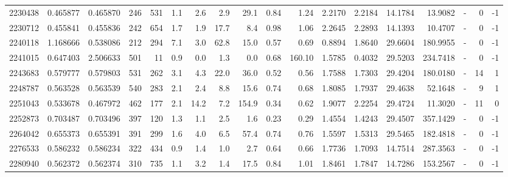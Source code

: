 \begin{tabular}{rrrrrrrrrrrrrrrlrr}
   2230438 & 0.465877 &   0.465870 &  246 &  531 &      1.1 &      2.6 &     2.9 &     29.1 &       0.84 &        1.24 &  2.2170 &  2.2184 &   14.1784 &   13.9082 &             - &        0 &         -1 \\
   2230712 & 0.455841 &   0.455836 &  242 &  654 &      1.7 &      1.9 &    17.7 &      8.4 &       0.98 &        1.06 &  2.2645 &  2.2893 &   14.1393 &   10.4707 &             - &        0 &         -1 \\
   2240118 & 1.168666 &   0.538086 &  212 &  294 &      7.1 &      3.0 &    62.8 &     15.0 &       0.57 &        0.69 &  0.8894 &  1.8640 &   29.6604 &  180.9955 &             - &        0 &         -1 \\
   2241015 & 0.647403 &   2.506633 &  501 &   11 &      0.9 &      0.0 &     1.3 &      0.0 &       0.68 &      160.10 &  1.5785 &  0.4032 &   29.5203 &  234.7418 &             - &        0 &         -1 \\
   2243683 & 0.579777 &   0.579803 &  531 &  262 &      3.1 &      4.3 &    22.0 &     36.0 &       0.52 &        0.56 &  1.7588 &  1.7303 &   29.4204 &  180.0180 &             - &       14 &          1 \\
   2248787 & 0.563528 &   0.563539 &  540 &  283 &      2.1 &      2.4 &     8.8 &     15.6 &       0.74 &        0.68 &  1.8085 &  1.7937 &   29.4638 &   52.1648 &             - &        9 &          1 \\
   2251043 & 0.533678 &   0.467972 &  462 &  177 &      2.1 &     14.2 &     7.2 &    154.9 &       0.34 &        0.62 &  1.9077 &  2.2254 &   29.4724 &   11.3020 &             - &       11 &          0 \\
   2252873 & 0.703487 &   0.703496 &  397 &  120 &      1.3 &      1.1 &     2.5 &      1.6 &       0.23 &        0.29 &  1.4554 &  1.4243 &   29.4507 &  357.1429 &             - &        0 &         -1 \\
   2264042 & 0.655373 &   0.655391 &  391 &  299 &      1.6 &      4.0 &     6.5 &     57.4 &       0.74 &        0.76 &  1.5597 &  1.5313 &   29.5465 &  182.4818 &             - &        0 &         -1 \\
   2276533 & 0.586232 &   0.586234 &  322 &  434 &      0.9 &      1.4 &     1.0 &      2.7 &       0.64 &        0.66 &  1.7736 &  1.7093 &   14.7514 &  287.3563 &             - &        0 &         -1 \\
   2280940 & 0.562372 &   0.562374 &  310 &  735 &      1.1 &      3.2 &     1.4 &     17.5 &       0.84 &        1.01 &  1.8461 &  1.7847 &   14.7286 &  153.2567 &             - &        0 &         -1 \\

\end{tabular}
